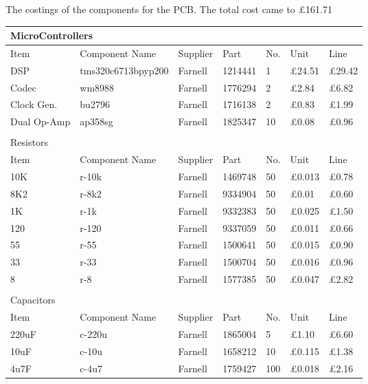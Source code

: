 The costings of the components for the PCB.
The total cost came to \pounds161.71

\begin{table}[H]
	\centering
	\begin{tabular}[c]{| l | l | l | p{50px} | l | l | l |}
		\hline
		\multicolumn{7}{|l|}{MicroControllers} \\
		\hline
		Item	& Component Name& Supplier & Part	& No.	& Unit  & Line \\
		\hline
		DSP	& tms320c6713bpyp200	& Farnell	& 1214441	& 1	& \pounds24.51	& \pounds29.42	\\
		Codec	& wm8988		& Farnell	& 1776294	& 2	& \pounds2.84	& \pounds6.82	\\
		Clock Gen.	& bu2796	& Farnell	& 1716138	& 2	& \pounds0.83	& \pounds1.99	\\
		Dual Op-Amp	& ap358sg	& Farnell	& 1825347	& 10	& \pounds0.08	& \pounds0.96	\\
		\hline
		\multicolumn{7}{|l|}{}\\
		\hline
		\multicolumn{7}{|l|}{Resistors} \\
		\hline
		Item	& Component Name& Supplier & Part	& No.	& Unit  & Line \\
		\hline
		10K\textohm	& r-10k	& Farnell	& 1469748	& 50	& \pounds0.013	& \pounds0.78	\\
		8K2\textohm	& r-8k2	& Farnell	& 9334904	& 50	& \pounds0.01	& \pounds0.60	\\
		1K\textohm	& r-1k	& Farnell	& 9332383	& 50	& \pounds0.025	& \pounds1.50	\\
		120\textohm	& r-120	& Farnell	& 9337059	& 50	& \pounds0.011	& \pounds0.66	\\
		55\textohm	& r-55	& Farnell	& 1500641	& 50	& \pounds0.015	& \pounds0.90	\\
		33\textohm	& r-33	& Farnell	& 1500704	& 50	& \pounds0.016	& \pounds0.96	\\
		8\textohm	& r-8	& Farnell	& 1577385	& 50	& \pounds0.047	& \pounds2.82	\\
		\hline
		\multicolumn{7}{|l|}{}\\
		\hline
		\multicolumn{7}{|l|}{Capacitors} \\
		\hline
		Item	& Component Name& Supplier & Part	& No.	& Unit  & Line  \\
		\hline
		220uF	& c-220u& Farnell	& 1865004	& 5	& \pounds1.10	& \pounds6.60	\\
		10uF	& c-10u	& Farnell	& 1658212	& 10	& \pounds0.115	& \pounds1.38	\\
		4u7F	& c-4u7	& Farnell	& 1759427	& 100	& \pounds0.018	& \pounds2.16	\\

\end{tabular}
\end{table}
